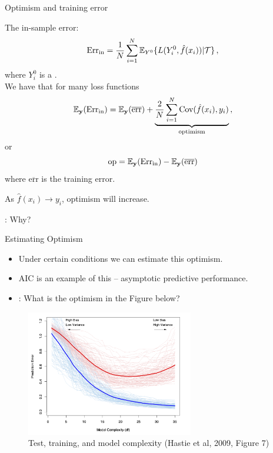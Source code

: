 \documentclass[10pt]{beamer}
\begin{document}

\begin{frame}{Optimism and training error}

The in-sample  error:
\[
\text{Err}_\text{in} = \frac{1}{N}\sum^N_{i=1} \operatorname{\mathbb{E}}_{Y^0}\{L(Y^0_i,\hat{f}(x_i))|\mathcal{T}\}\,,
\]
where $Y^0_i$ is a .\\[3mm]
\pause
We have that for many loss functions
\[
\operatorname{\mathbb{E}}_\mathbf{y} (\text{Err}_\text{in}) = \operatorname{\mathbb{E}}_\mathbf{y}(\overline{\text{err}}) + \underbrace{\frac{2}{N}\sum^N_{i=1} \text{Cov}(\hat{f}(x_i),y_i)}_{\text{optimism}}\,,
\]
or
\[
\text{op} = \operatorname{\mathbb{E}}_\mathbf{y} (\text{Err}_\text{in}) - \operatorname{\mathbb{E}}_\mathbf{y}(\overline{\text{err}})
\]
where $\overline{\text{err}}$ is the training error.

As $\hat{f}(x_i) \rightarrow y_i$, optimism will increase.

: Why?


\end{frame}

\begin{frame}{Estimating Optimism}

\begin{itemize}
\item Under certain conditions we can estimate this optimism.
\item AIC is an example of this -- asymptotic predictive performance.
\pause
\item {}: What is the optimism in the Figure below?
\end{itemize}


\begin{figure}[h]
\caption{Test, training, and model complexity (Hastie et al, 2009, Figure 7)}
\centering
\includegraphics[width=0.65\textwidth]{figs/ESL_7_1.png}
\end{figure}


\end{frame}
\end{document}
